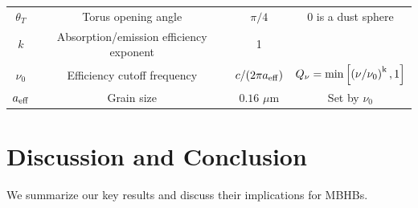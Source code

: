 \begin{table}
{\begin{tabular}{ c | c | c | c}
{$\theta_T$}     &  Torus opening angle                                   & $\pi/4$                     &   0 is a dust sphere\\
$k$             &  Absorption/emission efficiency exponent                      & 1                             &   \\
$\nu_0$     & Efficiency cutoff frequency                           &    $c/(2 \pi a_{\rm{eff}})$           & $Q_{\nu} = \rm{min}\left[ \left( \nu/ \nu_0 \right)^{k}, 1\right]$    \\
$a_{\rm{eff}}$  &  Grain size                                               &  $0.16$ $\mu$m                    &  Set by $\nu_0$       
 \label{Table:params}
 \end{tabular}
 }
\end{table}













\section{Discussion and Conclusion}
\label{S:Discussion}
We summarize our key results and discuss their implications for MBHBs.

